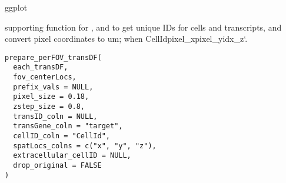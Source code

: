 \documentclass[letterpaper]{book}
\begin{document}
%
\begin{Value}
ggplot
\end{Value}
%
\begin{Description}
supporting function for ,  and  to get unique IDs for cells and transcripts, and convert pixel coordinates to um; when CellId\AsIs{\texttt{, }}pixel\_x\AsIs{\texttt{, }}pixel\_y\AsIs{\texttt{, }}idx\_z`.
\end{Description}
%
\begin{Usage}
\begin{verbatim}
prepare_perFOV_transDF(
  each_transDF,
  fov_centerLocs,
  prefix_vals = NULL,
  pixel_size = 0.18,
  zstep_size = 0.8,
  transID_coln = NULL,
  transGene_coln = "target",
  cellID_coln = "CellId",
  spatLocs_colns = c("x", "y", "z"),
  extracellular_cellID = NULL,
  drop_original = FALSE
)
\end{verbatim}
\end{Usage}
%
\end{document}
